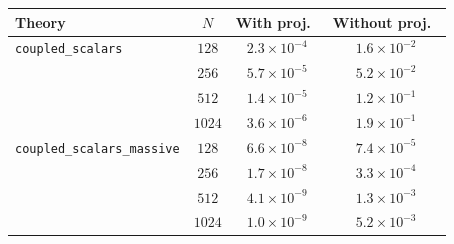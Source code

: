 \begin{tabular}{lccc}
  \toprule
  Theory & $N$ & With proj.\ & Without proj.\ \\
  \midrule
  \lstinline!coupled_scalars! & $128$ & $2.3\times10^{-4}$ & $1.6\times10^{-2}$ \\
   & $256$ & $5.7\times10^{-5}$ & $5.2\times10^{-2}$ \\
   & $512$ & $1.4\times10^{-5}$ & $1.2\times10^{-1}$ \\
   & $1024$ & $3.6\times10^{-6}$ & $1.9\times10^{-1}$ \\
  \lstinline!coupled_scalars_massive! & $128$ & $6.6\times10^{-8}$ & $7.4\times10^{-5}$ \\
   & $256$ & $1.7\times10^{-8}$ & $3.3\times10^{-4}$ \\
   & $512$ & $4.1\times10^{-9}$ & $1.3\times10^{-3}$ \\
   & $1024$ & $1.0\times10^{-9}$ & $5.2\times10^{-3}$ \\
  \bottomrule
\end{tabular}
